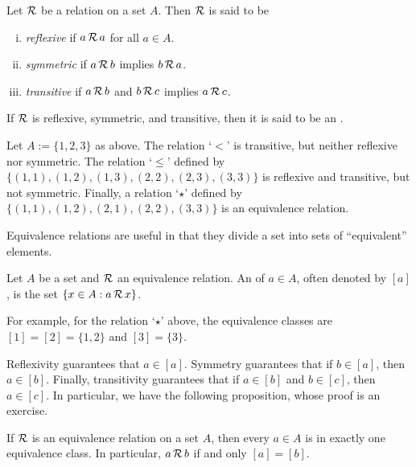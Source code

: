 \pagebreak[2]
\begin{defn}
Let ${\mathcal{R}}$ be a relation on a set $A$.  Then ${\mathcal{R}}$ is said to be
\begin{enumerate}[(i)]
\item
\emph{reflexive} if $a\, {\mathcal{R}} \, a$ for
all $a \in A$.
\item
\emph{symmetric} if $a\, {\mathcal{R}} \, b$ implies
$b \, {\mathcal{R}} \, a$.
\item
\emph{transitive} if $a\, {\mathcal{R}} \, b$ and
$b \, {\mathcal{R}} \, c$ implies $a\, {\mathcal{R}} \, c$.
\end{enumerate}
If ${\mathcal{R}}$ is reflexive, symmetric, and transitive, then it is said to be
an \emph{}.
\end{defn}

\begin{example}
Let $A := \{ 1,2,3 \}$ as above.
The relation `$<$' is transitive, but neither reflexive nor symmetric.  The
relation `$\leq$' defined by
$\bigl\{ (1,1), (1,2), (1,3), (2,2), (2,3), (3,3) \bigr\}$
is reflexive and transitive, but not symmetric.
Finally, a relation `$\star$' defined by
$\bigl\{ (1,1), (1,2), (2,1), (2,2), (3,3) \bigr\}$ is
an equivalence relation.
\end{example}

Equivalence relations are useful in that they divide a set into sets of
``equivalent'' elements.

\begin{defn}
Let $A$ be a set and ${\mathcal{R}}$ an equivalence relation.
An \emph{} of $a \in A$, often denoted
by $[a]$, is the set $\{ x \in A : a\, {\mathcal{R}} \, x \}$.
\end{defn}

For example, for the relation `$\star$' above, the equivalence classes
are $[1] = [2] = \{ 1,2 \}$ and $[3] = \{ 3 \}$.

Reflexivity guarantees that $a \in [a]$.  Symmetry guarantees
that if $b \in [a]$, then $a \in [b]$.  Finally, transitivity guarantees that
if $a \in [b]$ and $b \in [c]$, then $a \in [c]$.
In particular, we have the following proposition, whose proof is an
exercise.

\begin{prop} \label{prop:equivclasses}
If ${\mathcal{R}}$ is an equivalence relation on a set $A$,
then every $a \in A$ is in exactly one
equivalence class.  In particular, $a\, {\mathcal{R}} \, b$ if and only $[a] = [b]$.
\end{prop}

